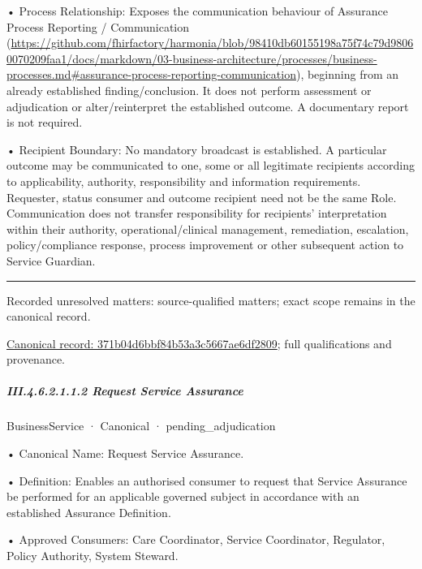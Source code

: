 •
Process Relationship: Exposes the communication behaviour of Assurance Process Reporting / Communication (\url{https://github.com/fhirfactory/harmonia/blob/98410db60155198a75f74c79d98060070209faa1/docs/markdown/03-business-architecture/processes/business-processes.md#assurance-process-reporting-communication}), beginning from an already established finding/conclusion. It does not perform assessment or adjudication or alter/reinterpret the established outcome. A documentary report is not required.



•
Recipient Boundary: No mandatory broadcast is established. A particular outcome may be communicated to one, some or all legitimate recipients according to applicability, authority, responsibility and information requirements. Requester, status consumer and outcome recipient need not be the same Role. Communication does not transfer responsibility for recipients' interpretation within their authority, operational/clinical management, remediation, escalation, policy/compliance response, process improvement or other subsequent action to Service Guardian.



\medskip\hrule\medskip

{\small Recorded unresolved matters: source-qualified matters; exact scope remains in the canonical record.}\par
{\footnotesize \href{../../../../../../../continuum/business/business-service/371b04d6bbf84b53a3c5667ae6df2809.md}{Canonical record: 371b04d6bbf84b53a3c5667ae6df2809}; full qualifications and provenance.}\par
\subparagraph*{III.4.6.2.1.1.2 Request Service Assurance}
\label{navigation:III.4.6.2.1.1.2}

\label{element:a76c0be369744fcfb5eb91b90c9b59e7}
{\small BusinessService · Canonical · pending\_adjudication}\par

•
Canonical Name: Request Service Assurance.



•
Definition: Enables an authorised consumer to request that Service Assurance be performed for an applicable governed subject in accordance with an established Assurance Definition.



•
Approved Consumers: Care Coordinator, Service Coordinator, Regulator, Policy Authority, System Steward.



